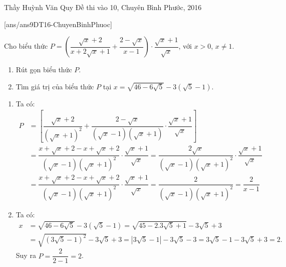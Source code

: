 \begin{name}
{Thầy  Huỳnh Văn Quy}
{Đề thi vào 10, Chuyên Bình Phước, 2016}
\end{name}
\setcounter{ex}{0}
[ans/ans9DT16-ChuyenBinhPhuoc]
\begin{ex}%
	Cho biểu thức $P=\left(\dfrac{\sqrt{x}+2}{x+2\sqrt{x}+1}+\dfrac{2-\sqrt{x}}{x-1}\right)\cdot\dfrac{\sqrt{x}+1}{\sqrt{x}}$, với $x>0$, $x\ne 1$.
    \hfill
    \begin{enumerate}
        \item Rút gọn biểu thức $P$.
        \item Tìm giá trị của biểu thức $P$ tại $x=\sqrt{46-6\sqrt{5}}-3\left(\sqrt{5}-1\right)$.
    \end{enumerate}
\loigiai
    {
    \begin{enumerate}
        \item Ta có:\\
        $\begin{aligned}
        P&=\left[\dfrac{\sqrt{x}+2}{(\sqrt{x}+1)^2}+\dfrac{2-\sqrt{x}}{(\sqrt{x}-1)(\sqrt{x}+1)}\cdot\dfrac{\sqrt{x}+1}{\sqrt{x}}\right]\\
        &=\dfrac{x+\sqrt{x}+2-x+\sqrt{x}+2}{(\sqrt{x}-1)(\sqrt{x}+1)^2}\cdot\dfrac{\sqrt{x}+1}{\sqrt{x}}=\dfrac{2\sqrt{x}}{(\sqrt{x}-1)(\sqrt{x}+1)^2}\cdot\dfrac{\sqrt{x}+1}{\sqrt{x}}\\
        &=\dfrac{x+\sqrt{x}+2-x+\sqrt{x}+2}{(\sqrt{x}-1)(\sqrt{x}+1)^2}\cdot\dfrac{\sqrt{x}+1}{\sqrt{x}}=\dfrac{2}{(\sqrt{x}-1)(\sqrt{x}+1)^2}=\dfrac{2}{x-1}
        \end{aligned}$
        \item Ta có:\\
         $\begin{aligned}
         x&=\sqrt{46-6\sqrt{5}}-3\left(\sqrt{5}-1\right)=\sqrt{45-2.3\sqrt{5}+1}-3\sqrt{5}+3\\
         &=\sqrt{\left(3\sqrt{5}-1\right)^2}-3\sqrt{5}+3=\left|3\sqrt{5}-1\right|-3\sqrt{5}-3=3\sqrt{5}-1-3\sqrt{5}+3=2.
         \end{aligned}$\\
         Suy ra $P=\dfrac{2}{2-1}=2$.
    \end{enumerate}
    }
\end{ex}

